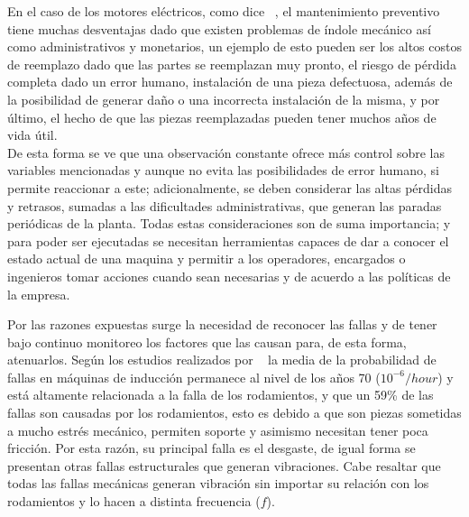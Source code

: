 	En el caso de los motores eléctricos, como dice ~\textcite{Lacey}, el mantenimiento preventivo tiene muchas desventajas dado que existen problemas de índole mecánico así como administrativos y monetarios, un ejemplo de esto pueden ser los altos costos de reemplazo dado que las partes se reemplazan muy pronto, el riesgo de pérdida completa dado un error humano, instalación de una pieza defectuosa, además de la posibilidad de generar daño o una incorrecta instalación de la misma, y por último, el hecho de que las piezas reemplazadas pueden tener muchos años de vida útil.\\
	
	
	De esta forma se ve que una observación constante ofrece más control sobre las variables mencionadas y aunque no evita las posibilidades de error humano, si permite reaccionar a este; adicionalmente, se deben considerar las altas pérdidas y retrasos, sumadas a las dificultades administrativas, que generan las paradas periódicas de la planta. Todas estas consideraciones son de suma importancia; y para poder ser ejecutadas se necesitan herramientas capaces de dar a conocer el estado actual de una maquina y permitir a los operadores, encargados o ingenieros tomar acciones cuando sean necesarias y de acuerdo a las políticas de la empresa. 


	Por las razones expuestas surge la necesidad de reconocer las fallas y de tener bajo continuo monitoreo los factores que las causan para, de esta forma, atenuarlos. Según los estudios realizados por ~\textcite{Kammermann} la media de la probabilidad de fallas en máquinas de inducción permanece al nivel de los años 70 ($10^{-6}/hour$) y está altamente relacionada a la falla de los rodamientos, y que un 59\% de las fallas son causadas por los rodamientos, esto es debido a que son piezas sometidas a mucho estrés mecánico, permiten soporte y asimismo necesitan tener poca fricción. Por esta razón, su principal falla es el desgaste, de igual forma se presentan otras fallas estructurales que generan vibraciones. Cabe resaltar que todas las fallas mecánicas generan vibración sin importar su relación con los rodamientos y lo hacen a distinta frecuencia ($f$). \\



